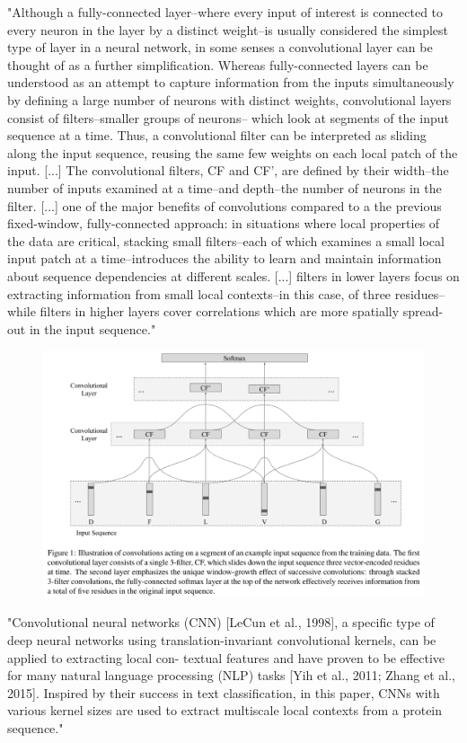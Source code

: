 \documentclass[]{scrartcl}
\begin{document}
"Although a fully-connected layer–where every input of interest is connected to every neuron in the layer by a distinct weight–is usually considered the simplest type of layer in a neural network, in some senses a convolutional layer can be thought of as a further simplification. Whereas fully-connected layers can be understood as an attempt to capture information from the inputs simultaneously by defining a large number of neurons with distinct weights, convolutional layers consist of filters–smaller groups of neurons– which look at segments of the input sequence at a time. Thus, a convolutional filter can be interpreted as sliding along the input sequence, reusing the same few weights on each local patch of the input. [...] The convolutional filters, CF and CF’, are defined by their width–the number of inputs examined at a time–and depth–the number of neurons in the filter. [...] one of the major benefits of convolutions compared to a the previous fixed-window, fully-connected approach: in situations where local properties of the data are critical, stacking small filters–each of which examines a small local input patch at a time–introduces the ability to learn and maintain information about sequence dependencies at different scales. [...] filters in lower layers focus on extracting information from small local contexts–in this case, of three residues–while filters in higher layers cover correlations which are more spatially spread-out in the input sequence." \cite{Busia2017}
\begin{figure}[h]
	\centering
	\includegraphics[width=1\linewidth]{stackedCNN}
\end{figure}

"Convolutional neural networks (CNN) [LeCun et al., 1998], a specific type of deep neural networks using translation-invariant convolutional kernels, can be applied to extracting local con- textual features and have proven to be effective for many natural language processing (NLP) tasks [Yih et al., 2011; Zhang et al., 2015]. Inspired by their success in text classification, in this paper, CNNs with various kernel sizes are used to extract multiscale local contexts from a protein sequence." \cite{Li2016}
\end{document}
